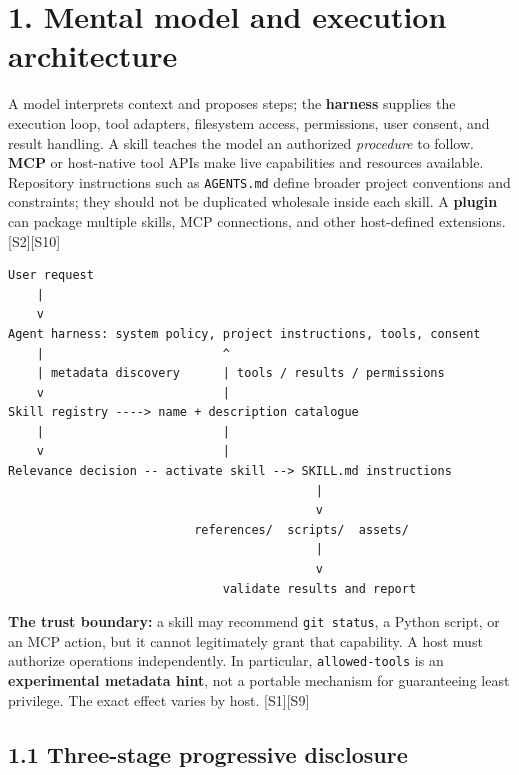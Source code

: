 \documentclass[
  10pt,
  letterpaper,
]{article}
\newcommand{\passthrough}[1]{#1}
\begin{document}
\section{1. Mental model and execution
architecture}\label{mental-model-and-execution-architecture}

A model interprets context and proposes steps; the \textbf{harness}
supplies the execution loop, tool adapters, filesystem access,
permissions, user consent, and result handling. A skill teaches the
model an authorized \emph{procedure} to follow. \textbf{MCP} or
host-native tool APIs make live capabilities and resources available.
Repository instructions such as \passthrough{\lstinline!AGENTS.md!}
define broader project conventions and constraints; they should not be
duplicated wholesale inside each skill. A \textbf{plugin} can package
multiple skills, MCP connections, and other host-defined extensions.
{[}S2{]}{[}S10{]}

\begin{lstlisting}
User request
    |
    v
Agent harness: system policy, project instructions, tools, consent
    |                         ^
    | metadata discovery      | tools / results / permissions
    v                         |
Skill registry ----> name + description catalogue
    |                         |
    v                         |
Relevance decision -- activate skill --> SKILL.md instructions
                                           |
                                           v
                          references/  scripts/  assets/
                                           |
                                           v
                              validate results and report
\end{lstlisting}

\textbf{The trust boundary:} a skill may recommend
\passthrough{\lstinline!git status!}, a Python script, or an MCP action,
but it cannot legitimately grant that capability. A host must authorize
operations independently. In particular,
\passthrough{\lstinline!allowed-tools!} is an \textbf{experimental
metadata hint}, not a portable mechanism for guaranteeing least
privilege. The exact effect varies by host. {[}S1{]}{[}S9{]}

\subsection{1.1 Three-stage progressive
disclosure}\label{three-stage-progressive-disclosure}
\end{document}
